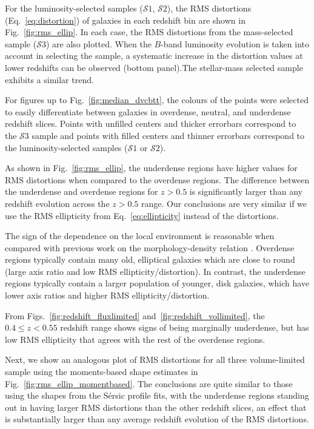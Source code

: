 \documentclass[twocolumn,useAMS,usenatbib]{mn2e}
\newcommand{\sersic}{S\'{e}rsic }
\newcommand{\s}{\ensuremath{\mathcal{S}}}
\begin{document}
For the luminosity-selected samples (\s$1$, \s$2$), the
RMS distortions (Eq.~\ref{eq:distortion}) of galaxies in each redshift bin are shown
in Fig.~\ref{fig:rms_ellip}. In each case, the RMS distortions from the mass-selected sample (\s$3$) are also plotted.
When the $B$-band luminosity evolution is taken into account in selecting the sample, a systematic increase in the distortion values at
lower redshifts can be observed (bottom panel).The stellar-mass selected sample exhibits a similar trend.

For figures up to Fig.~\ref{fig:median_dvcbtt}, the colours of the points were selected to easily differentiate between galaxies in overdense, neutral, and underdense redshift slices.
Points with unfilled centers and thicker errorbars correspond to the \s$3$ sample and points with filled centers and thinner errorbars correspond to the luminosity-selected samples (\s$1$ or \s$2$).

As shown in Fig.~\ref{fig:rms_ellip}, the underdense regions have higher values for RMS distortions when compared to the
overdense regions. The difference between the underdense and overdense
regions for $z>0.5$ is significantly larger than any redshift
evolution across the $z>0.5$ range.  
Our conclusions are very similar if we use the RMS ellipticity from Eq.~\eqref{eq:ellipticity} instead
of the distortions.

The sign of the dependence on the local environment is reasonable when
compared with previous work on the morphology-density
relation \citep[see, e.g.][]{2010ApJ...714.1779V}. Overdense regions typically contain many old, elliptical
galaxies which are close to round (large axis ratio and low RMS ellipticity/distortion). 
In contrast, the underdense regions typically contain a larger
population of younger, disk galaxies, which have lower axis ratios and
higher RMS ellipticity/distortion.

From Figs.~\ref{fig:redshift_fluxlimited} and~\ref{fig:redshift_vollimited},
the $0.4\le z < 0.55$ redshift range shows signs of being marginally
underdense, but has low RMS ellipticity that agrees with the rest of the overdense regions.

Next, we show an analogous plot of RMS distortions for all three
volume-limited sample using the moments-based shape estimates in
Fig.~\ref{fig:rms_ellip_momentbased}. The conclusions are quite
similar to those using the shapes from the \sersic profile fits, with
the underdense regions standing out in having larger RMS distortions 
than the other redshift slices, an effect that is substantially larger
than any average redshift evolution of the RMS distortions.
\end{document}
